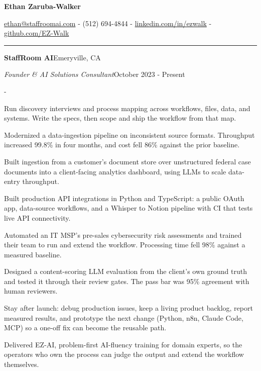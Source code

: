 \documentclass[10pt,letterpaper]{article}
\newenvironment{cvitems}{%
  \begin{list}{-}{%
    \setlength{\leftmargin}{12pt}%
    \setlength{\itemsep}{1.2pt}%
    \setlength{\parsep}{0pt}%
    \setlength{\topsep}{1.5pt}%
    \setlength{\partopsep}{0pt}%
    \setlength{\labelwidth}{6pt}%
    \setlength{\labelsep}{6pt}%
    \setlength{\itemindent}{0pt}%
  }%
}{\end{list}}
\newcommand{\cvsection}[1]{%
  \vspace{7pt}%
  \noindent{\bfseries\fontsize{11pt}{13pt}\selectfont\MakeUppercase{#1}}\par
  \vspace{1pt}%
  \noindent\rule{\textwidth}{0.4pt}\par
  \vspace{4pt}%
}
\newcommand{\cventryhead}[4]{%
  \noindent\textbf{#1}\hfill#2\par
  \vspace{0.5pt}%
  \noindent\textit{#3}\hfill#4\par
}
\begin{document}
\begin{center}
  {\bfseries\fontsize{22pt}{24pt}\selectfont Ethan Zaruba-Walker\par}
  \vspace{4pt}
  {\fontsize{10pt}{12pt}\selectfont
    \href{mailto:ethan@staffroomai.com}{ethan@staffroomai.com}
    {-}
    (512) 694-4844
    {-}
    \href{https://linkedin.com/in/ezwalk}{linkedin.com/in/ezwalk}
    {-}
    \href{https://github.com/EZ-Walk}{github.com/EZ-Walk}\par}
\end{center}
\vspace{2pt}

\cvsection{Experience}

\cventryhead{StaffRoom AI}{Emeryville, CA}
{Founder \& AI Solutions Consultant}{October 2023 - Present}
\begin{cvitems}
  \item Run discovery interviews and process mapping across workflows, files, data, and systems. Write the specs, then scope and ship the workflow from that map.
  \item Modernized a data-ingestion pipeline on inconsistent source formats. Throughput increased 99.8\% in four months, and cost fell 86\% against the prior baseline.
  \item Built ingestion from a customer's document store over unstructured federal case documents into a client-facing analytics dashboard, using LLMs to scale data-entry throughput.
  \item Built production API integrations in Python and TypeScript: a public OAuth app, data-source workflows, and a Whisper to Notion pipeline with CI that tests live API connectivity.
  \item Automated an IT MSP's pre-sales cybersecurity risk assessments and trained their team to run and extend the workflow. Processing time fell 98\% against a measured baseline.
  \item Designed a content-scoring LLM evaluation from the client's own ground truth and tested it through their review gates. The pass bar was 95\% agreement with human reviewers.
  \item Stay after launch: debug production issues, keep a living product backlog, report measured results, and prototype the next change (Python, n8n, Claude Code, MCP) so a one-off fix can become the reusable path.
  \item Delivered EZ-AI, problem-first AI-fluency training for domain experts, so the operators who own the process can judge the output and extend the workflow themselves.
\end{cvitems}
\end{document}
